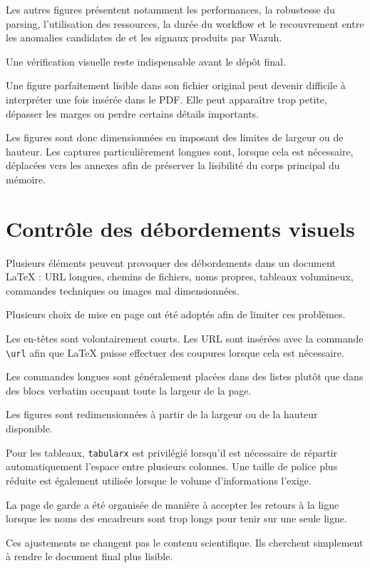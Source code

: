 Les autres figures présentent notamment les performances, la robustesse du parsing, l'utilisation des ressources, la durée du workflow et le recouvrement entre les anomalies candidates de \logminer{} et les signaux produits par Wazuh.

Une vérification visuelle reste indispensable avant le dépôt final.

Une figure parfaitement lisible dans son fichier original peut devenir difficile à interpréter une fois insérée dans le PDF. Elle peut apparaître trop petite, dépasser les marges ou perdre certains détails importants.

Les figures sont donc dimensionnées en imposant des limites de largeur ou de hauteur. Les captures particulièrement longues sont, lorsque cela est nécessaire, déplacées vers les annexes afin de préserver la lisibilité du corps principal du mémoire.

\section{Contrôle des débordements visuels}

Plusieurs éléments peuvent provoquer des débordements dans un document LaTeX : URL longues, chemins de fichiers, noms propres, tableaux volumineux, commandes techniques ou images mal dimensionnées.

Plusieurs choix de mise en page ont été adoptés afin de limiter ces problèmes.

Les en-têtes sont volontairement courts. Les URL sont insérées avec la commande \verb|\url| afin que LaTeX puisse effectuer des coupures lorsque cela est nécessaire.

Les commandes longues sont généralement placées dans des listes plutôt que dans des blocs verbatim occupant toute la largeur de la page.

Les figures sont redimensionnées à partir de la largeur ou de la hauteur disponible.

Pour les tableaux, \texttt{tabularx} est privilégié lorsqu'il est nécessaire de répartir automatiquement l'espace entre plusieurs colonnes. Une taille de police plus réduite est également utilisée lorsque le volume d'informations l'exige.

La page de garde a été organisée de manière à accepter les retours à la ligne lorsque les noms des encadreurs sont trop longs pour tenir sur une seule ligne.

Ces ajustements ne changent pas le contenu scientifique. Ils cherchent simplement à rendre le document final plus lisible.

